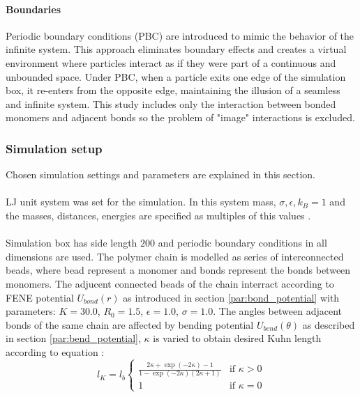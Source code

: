 \documentclass[
    paper=A4,pagesize=automedia,fontsize=12pt,
    BCOR=15mm,DIV=22,
    twoside,headinclude,footinclude=false,
    ngerman,fleqn,             %
    bibliography=totocnumbered,          %
    listof=totoc,                %
    listof=flat,                 %
    cleardoublepage=empty      %
    numbers=endperiod
]{scrartcl}
\begin{document}
\paragraph{Boundaries}
Periodic boundary conditions (PBC) are introduced to mimic the behavior of the infinite system.
This approach eliminates boundary effects and creates a virtual environment where particles 
interact as if they were part of a continuous and unbounded space.
Under PBC, when a particle exits one edge of the simulation box, it re-enters from the opposite edge, 
maintaining the illusion of a seamless and infinite system. This study includes only the interaction
between bonded monomers and adjacent bonds so the problem of "image" interactions is excluded. 


\subsubsection{Simulation setup}
Chosen simulation settings and parameters are explained in this section.
\\
\\
LJ unit system was set for the simulation. In this system 
mass, $\sigma, \epsilon, k_B = 1$ and the masses, distances, energies are specified
as multiples of this values \cite{LAMMPS}.
\\
\\
Simulation box has side length $200$ and periodic boundary conditions in all 
dimensions are used. The polymer chain is modelled as series of interconnected
beads, where bead represent a monomer and bonds represent the bonds between monomers.
The adjucent connected beads of the chain interract according to FENE potential $U_{bond}(r)$
as introduced in section \ref{par:bond_potential} with parameters: 
$K=30.0$, $R_0=1.5$, $\epsilon=1.0$, $\sigma=1.0$.
The angles between adjacent bonds of the same chain are affected by bending potential
$U_{bend}(\theta)$ as described in section \ref{par:bend_potential}, $\kappa$ is varied to obtain
desired Kuhn length according to equation \cite{svaneborg_2020}:
\begin{equation}
    l_K = l_b 
    \begin{cases}
        \frac{2 \kappa + \exp(-2 \kappa) - 1}{1-\exp(-2\kappa)(2\kappa + 1)} & \text{if } \kappa > 0 \\
        1 & \text{if } \kappa = 0 
    \end{cases}
\end{equation}
\\
\\
\end{document}

